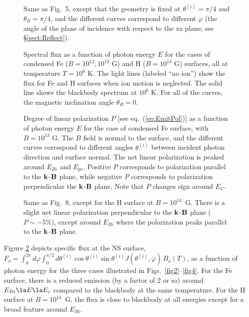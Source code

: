 \documentclass{emulateapj}
\newcommand{\bB}{{\bf B}}
\newcommand{\bk}{{\bf k}}
\begin{document}
\begin{figure}
\caption{Same as Fig.~5, except that the geometry is 
fixed at $\theta^{(i)}=\pi/4$ and $\theta_B=\pi/4$, and the different
curves correspond to different $\varphi$ (the angle of the plane 
of incidence with respect to the xz plane; see \S\ref{sect:Reflect}).}
\label{fig6}
\end{figure}

\begin{figure}
\caption{Spectral flux as a function of 
photon energy $E$ for the cases of condensed Fe 
($B=10^{12},10^{13}$ G) and H ($B=10^{14}$ G)
surfaces, all at temperature $T = 10^6$ K. The light lines (labeled ``no ion'') 
show the flux for Fe and 
H surfaces when ion motion is neglected.
The solid line shows the 
blackbody spectrum at $10^6$ K.  
For all of the curves, the magnetic 
inclination angle $\theta_B=0$.
}
\label{fig7}
\end{figure}

\begin{figure}
\caption{Degree of linear polarization $P$ 
[see eq.~(\ref{eq:EmitPol})] as a function of photon energy $E$ for the 
case of condensed Fe surface, with $B=10^{13}$ G. The $B$ field is normal
to the surface, and the different curves correspond to different 
angles $\theta^{(i)}$ between incident photon direction and surface normal.
The net linear polarization is peaked around $E_{Bi}$ and $E_{pe}$.  
Positive $P$ corresponds to polarization parallel to the 
$\bk$-$\bB$ plane, while negative $P$ corresponds to polarization 
perpendicular the $\bk$-$\bB$ plane. Note that $P$ changes sign
around $E_C$.}
\label{fig8}
\end{figure}

\begin{figure}
\caption{Same as Fig.~8, except for the H surface at $B=10^{14}$~G.  
There is a slight net linear polarization perpendicular to the 
$\bk$-$\bB$ plane ($P\sim -5\%$), except around 
$E_{Bi}$ where the polarization peaks parallel to the $\bk$-$\bB$ plane.}
\label{fig9}
\end{figure}

Figure \ref{fig7} depicts specific flux at the NS surface, {$F_{\nu} = \int_0^{2\pi} d\varphi \int_0^{\pi/2} d\theta^{(i)} \cos\theta^{(i)} 
\sin\theta^{(i)} J(\theta^{(i)},
\varphi)\,B_{\nu}(T)$}, as a function of photon energy for the three 
cases illustrated in Figs.\ \ref{fig2}--\ref{fig4}.  For the Fe surface, 
there is a reduced emission (by a factor of 2 or so) around $E_{Bi}\la E\la E_c$ compared 
to the blackbody at the same temperature. For the H surface
at $B=10^{14}$~G, the flux is close to blackbody at all 
energies except for a broad feature around $E_{Bi}$.
\end{document}
